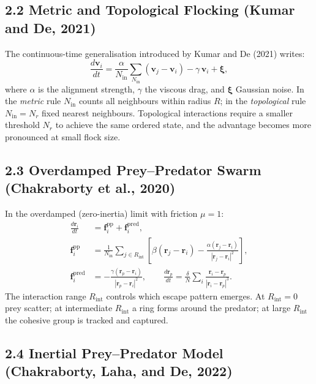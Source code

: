 \documentclass[11pt,a4paper]{article}
\begin{document}
\subsection{2.2 Metric and Topological Flocking (Kumar and De, 2021)}

The continuous-time generalisation introduced by Kumar and De (2021) writes:
\begin{equation}
  \frac{d\mathbf{v}_i}{dt}
  = \frac{\alpha}{N_\mathrm{in}}\sum_{N_\mathrm{in}}(\mathbf{v}_j - \mathbf{v}_i)
    - \gamma\,\mathbf{v}_i + \boldsymbol{\xi},
\end{equation}
where $\alpha$ is the alignment strength, $\gamma$ the viscous drag, and
$\boldsymbol{\xi}$ Gaussian noise. In the \textit{metric} rule $N_\mathrm{in}$
counts all neighbours within radius $R$; in the \textit{topological} rule
$N_\mathrm{in} = N_r$ fixed nearest neighbours. Topological interactions
require a smaller threshold $N_r$ to achieve the same ordered state, and the
advantage becomes more pronounced at small flock size.

\subsection{2.3 Overdamped Prey--Predator Swarm (Chakraborty et al., 2020)}

In the overdamped (zero-inertia) limit with friction $\mu=1$:
\begin{align}
  \frac{d\mathbf{r}_i}{dt}
    &= \mathbf{f}_i^{\mathrm{pp}} + \mathbf{f}_i^{\mathrm{pred}}, \\
  \mathbf{f}_i^{\mathrm{pp}}
    &= \frac{1}{N_\mathrm{in}}\sum_{j\in R_\mathrm{int}}
      \!\left[\beta(\mathbf{r}_j - \mathbf{r}_i)
      - \frac{\alpha(\mathbf{r}_j-\mathbf{r}_i)}{|\mathbf{r}_j-\mathbf{r}_i|^2}
      \right], \\
  \mathbf{f}_i^{\mathrm{pred}}
    &= -\frac{\gamma(\mathbf{r}_p - \mathbf{r}_i)}{|\mathbf{r}_p-\mathbf{r}_i|^2},
    \qquad
  \frac{d\mathbf{r}_p}{dt}
    = \frac{\delta}{N}\sum_i
      \frac{\mathbf{r}_i - \mathbf{r}_p}{|\mathbf{r}_i-\mathbf{r}_p|^3}.
\end{align}
The interaction range $R_\mathrm{int}$ controls which escape pattern emerges.
At $R_\mathrm{int}=0$ prey scatter; at intermediate $R_\mathrm{int}$ a ring
forms around the predator; at large $R_\mathrm{int}$ the cohesive group
is tracked and captured.

\subsection{2.4 Inertial Prey--Predator Model (Chakraborty, Laha, and De, 2022)}
\end{document}
